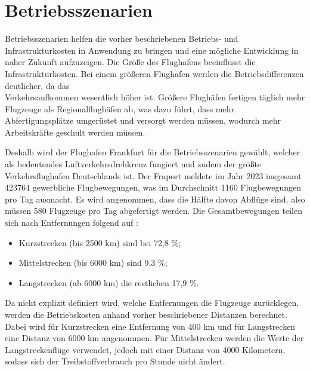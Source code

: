 
\section{Betriebsszenarien}
\label{s:Betriebsszenarien}
Betriebsszenarien helfen die vorher beschriebenen Betriebs- und Infrastrukturkosten 
in Anwendung zu bringen und eine mögliche Entwicklung in naher Zukunft aufzuzeigen. 
Die Größe des Flughafens beeinflusst die Infrastrukturkosten. 
Bei einem größeren Flughafen werden die Betriebsdifferenzen deutlicher, 
da das \\Verkehrsaufkommen wesentlich höher ist.
Größere Flughäfen fertigen täglich mehr Flugzeuge als Regionalflughäfen ab, 
was dazu führt, dass mehr Abfertigungsplätze umgerüstet und versorgt werden müssen,
wodurch mehr Arbeitskräfte geschult werden müssen.

Deshalb wird der Flughafen Frankfurt für die Betriebsszenarien gewählt,
welcher als bedeutendes Luftverkehrsdrehkreuz fungiert
und zudem der größte Verkehrsflughafen Deutschlands ist.
Der Fraport meldete im Jahr 2023 insgesamt 423764 gewerbliche Flugbewegungen, 
was im Durchschnitt 1160 Flugbewegungen pro Tag ausmacht. 
Es wird angenommen, dass die Hälfte davon Abflüge sind, 
also müssen 580 Flugzeuge pro Tag abgefertigt werden.
%
Die Gesamtbewegungen teilen sich nach Entfernungen folgend auf \cite{fraport2023frankfurt}:
\begin{itemize}
    \item Kurzstrecken (bis 2500 km) sind bei 72,8 \%;
    \item Mittelstrecken (bis 6000 km) sind 9,3 \%;
    \item Langstrecken (ab 6000 km) die restlichen 17,9 \%. 
    \end{itemize}
Da nicht explizit definiert wird, welche Entfernungen die Flugzeuge zurücklegen, 
werden die Betriebskosten anhand vorher beschriebener Distanzen berechnet.
Dabei wird für Kurzstrecken eine Entfernung von 400 km 
und für Langstrecken eine Distanz von 6000 km angenommen.
Für Mittelstrecken werden die Werte der Langstreckenflüge verwendet, 
jedoch mit einer Distanz von 4000 Kilometern, 
sodass sich der Treibstoffverbrauch pro Stunde nicht ändert.

